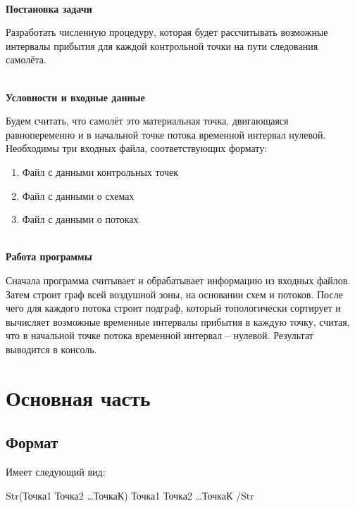 \documentclass[12pt, a4 paper]{article}
\theoremstyle{plain}
\newtheorem{definition}{Определение}
\begin{document}
{\textbf{\\Постановка задачи}}

Разработать численную процедуру, которая будет рассчитывать возможные интервалы прибытия  для каждой контрольной точки на пути следования самолёта.

{\textbf{\\ Условности и входные данные}}

Будем считать, что самолёт это материальная точка, двигающаяся равнопеременно и в начальной точке потока временной интервал нулевой. 
Необходимы три входных файла, соответствующих формату:
\begin{enumerate}
	\item Файл с данными контрольных точек
	\item Файл с данными о схемах
	\item Файл с данными о потоках
\end{enumerate}

{\textbf{\\ Работа программы}}

Сначала программа считывает и обрабатывает информацию из входных файлов. Затем строит граф всей воздушной зоны, на основании схем и потоков. После чего для каждого потока строит подграф, который топологически сортирует и вычисляет возможные временные интервалы прибытия в каждую точку, считая, что в начальной точке потока временной интервал – нулевой. Результат выводится в консоль.

\newpage

\section*{Основная часть}

\subsection*{Формат}

\begin{definition}{Спрямление - возможность прервать выполнение текущей схемы и уйти на заданную(ые) точки.
\end{definition}

Имеет следующий вид:

Str(Точка1 Точка2  \ldots  ТочкаК) Точка1 Точка2 \ldots ТочкаК /Str
\end{document}
